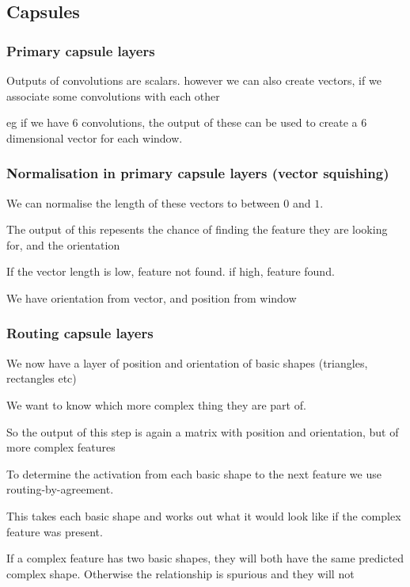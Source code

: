 
\subsection{Capsules}

\subsubsection{Primary capsule layers}

Outputs of convolutions are scalars. however we can also create vectors, if we associate some convolutions with each other

eg if we have 6 convolutions, the output of these can be used to create a 6 dimensional vector for each window.

\subsubsection{Normalisation in primary capsule layers (vector squishing)}

We can normalise the length of these vectors to between \(0\) and \(1\).

The output of this repesents the chance of finding the feature they are looking for, and the orientation

If the vector length is low, feature not found. if high, feature found.

We have orientation from vector, and position from window

\subsubsection{Routing capsule layers}

We now have a layer of position and orientation of basic shapes (triangles, rectangles etc)

We want to know which more complex thing they are part of.

So the output of this step is again a matrix with position and orientation, but of more complex features

To determine the activation from each basic shape to the next feature we use routing-by-agreement.

This takes each basic shape and works out what it would look like if the complex feature was present.

If a complex feature has two basic shapes, they will both have the same predicted complex shape. Otherwise the relationship is spurious and they will not

